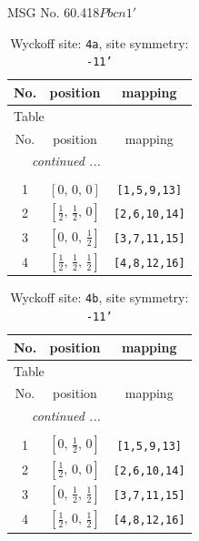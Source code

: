 \documentclass[fleqn,8pt]{jsarticle}
\begin{document}
\setcounter{MaxMatrixCols}{32}

\renewcommand{\tablename}{Table~}
\renewcommand{\figurename}{Figure~}
\begin{center}
\LARGE
MSG No. 60.418\quad$Pbcn1'$
\end{center}
\renewcommand{\arraystretch}{1.2}
\begin{longtable}{ccc}
\caption{Wyckoff site: {\tt 4a}, site symmetry: {\tt -11'}}
 \\
 \hline \hline
No. & position & mapping \\ \hline \endfirsthead

\multicolumn{2}{l}{\tablename\ \thetable{}} \\
 \hline \hline
No. & position & mapping \\ \hline \endhead

 \hline \hline
\multicolumn{2}{r}{\footnotesize\it continued ...} \\ \endfoot

 \hline \hline
\multicolumn{2}{r}{} \\ \endlastfoot

1 & $\left[ 0,\, 0,\, 0 \right]$ & {\tt [1,5,9,13]} \\ \hline
2 & $\left[ \frac{1}{2},\, \frac{1}{2},\, 0 \right]$ & {\tt [2,6,10,14]} \\ \hline
3 & $\left[ 0,\, 0,\, \frac{1}{2} \right]$ & {\tt [3,7,11,15]} \\ \hline
4 & $\left[ \frac{1}{2},\, \frac{1}{2},\, \frac{1}{2} \right]$ & {\tt [4,8,12,16]} \\
\end{longtable}
\renewcommand{\arraystretch}{1.2}
\begin{longtable}{ccc}
\caption{Wyckoff site: {\tt 4b}, site symmetry: {\tt -11'}}
 \\
 \hline \hline
No. & position & mapping \\ \hline \endfirsthead

\multicolumn{2}{l}{\tablename\ \thetable{}} \\
 \hline \hline
No. & position & mapping \\ \hline \endhead

 \hline \hline
\multicolumn{2}{r}{\footnotesize\it continued ...} \\ \endfoot

 \hline \hline
\multicolumn{2}{r}{} \\ \endlastfoot

1 & $\left[ 0,\, \frac{1}{2},\, 0 \right]$ & {\tt [1,5,9,13]} \\ \hline
2 & $\left[ \frac{1}{2},\, 0,\, 0 \right]$ & {\tt [2,6,10,14]} \\ \hline
3 & $\left[ 0,\, \frac{1}{2},\, \frac{1}{2} \right]$ & {\tt [3,7,11,15]} \\ \hline
4 & $\left[ \frac{1}{2},\, 0,\, \frac{1}{2} \right]$ & {\tt [4,8,12,16]} \\
\end{longtable}
\end{document}
